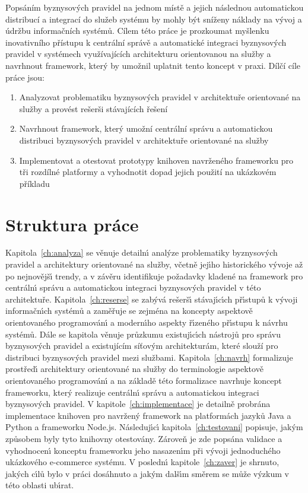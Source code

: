 Popsáním byznysových pravidel na jednom místě a jejich následnou automatickou distribucí
a integrací do služeb systému by mohly být sníženy náklady na vývoj a údržbu informačních systémů.
Cílem této práce je prozkoumat myšlenku inovativního přístupu k centrální správě
a automatické integraci byznysových pravidel v systémech využívajících architekturu orientovanou na služby
a navrhnout framework, který by umožnil uplatnit tento koncept v praxi. Dílčí cíle práce jsou:
\begin{enumerate}
    \item Analyzovat problematiku byznysových pravidel v architektuře orientované na služby a provést rešerši stávajících řešení
    \item Navrhnout framework, který umožní centrální správu a automatickou distribuci byznysových pravidel v architektuře orientované na služby
    \item Implementovat a otestovat prototypy knihoven navrženého frameworku pro tři rozdílné platformy a vyhodnotit dopad jejich použití na ukázkovém příkladu
\end{enumerate}

\section{Struktura práce}

Kapitola~\ref{ch:analyza} se věnuje detailn\'{\i} anal\'yze problematiky byznysov\'ych pravidel a
architektury orientované na služby, včetně jej\'{\i}ho historického v\'yvoje až po nejnovějš\'{\i} trendy,
a v závěru identifikuje požadavky kladené na framework pro centráln\'{\i} správu a
automatickou integraci byznysov\'ych pravidel v této architektuře. Kapitola~\ref{ch:reserse}
se zab\'yvá rešerš\'{\i} stávaj\'{\i}c\'{\i}ch př\'{\i}stupů k v\'yvoji informačn\'{\i}ch systémů a zaměřuje se zejména
na koncepty aspektově orientovaného programován\'{\i} a modern\'{\i}ho aspekty ř\'{\i}zeného př\'{\i}stupu k návrhu
systémů. Dále se kapitola věnuje průzkumu existuj\'{\i}c\'{\i}ch nástrojů pro správu byznysov\'ych pravidel a existujícím
síťovým architekturám, které slouží pro distribuci byznysových pravidel mezi službami.
Kapitola~\ref{ch:navrh} formalizuje prostřed\'{\i} architektury orientované na služby do terminologie
aspektově orientovaného programován\'{\i} a na základě této formalizace navrhuje koncept frameworku,
kter\'y realizuje centráln\'{\i} správu a automatickou integraci byznysov\'ych pravidel.
V kapitole~\ref{ch:implementace} je detailně probrána implementace knihoven pro navržen\'y framework
na platformách jazyků Java a Python a frameworku Node.js. Následuj\'{\i}c\'{\i} kapitola~\ref{ch:testovani}
popisuje, jak\'ym způsobem byly tyto knihovny otestovány. Zároveň je zde popsána validace a
vyhodnocen\'{\i} konceptu frameworku jeho nasazen\'{\i}m při v\'yvoji
jednoduchého ukázkového e-commerce systému. V posledn\'{\i} kapitole~\ref{ch:zaver} je shrnuto, jak\'ych
c\'{\i}lů bylo v práci dosáhnuto a jak\'ym dalš\'{\i}m směrem se může v\'yzkum v této oblasti ub\'{\i}rat.
